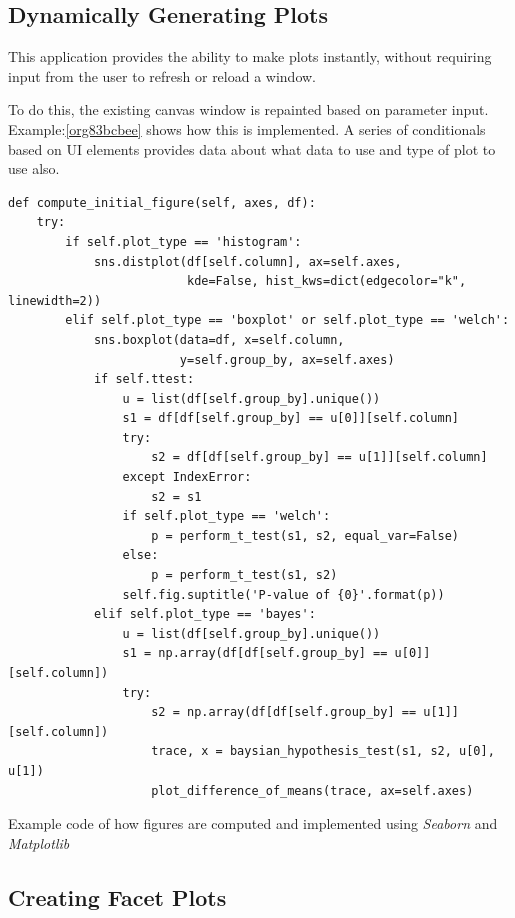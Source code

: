 \documentclass[11pt]{report}
\begin{document}
\subsection{Dynamically Generating Plots}
\label{sec:orge625e67}
This application provides the ability to make plots instantly, without requiring input from the user to refresh or reload a window.

To do this, the existing canvas window is repainted based on parameter input. Example:\ref{org83bcbee}
shows how this is implemented. A series of conditionals based on UI elements provides data about what data to use and type of plot to use also.

\begin{listing}[htbp]
\begin{verbatim}
def compute_initial_figure(self, axes, df):
    try:
        if self.plot_type == 'histogram':
            sns.distplot(df[self.column], ax=self.axes,
                         kde=False, hist_kws=dict(edgecolor="k", linewidth=2))
        elif self.plot_type == 'boxplot' or self.plot_type == 'welch':
            sns.boxplot(data=df, x=self.column,
                        y=self.group_by, ax=self.axes)
            if self.ttest:
                u = list(df[self.group_by].unique())
                s1 = df[df[self.group_by] == u[0]][self.column]
                try:
                    s2 = df[df[self.group_by] == u[1]][self.column]
                except IndexError:
                    s2 = s1
                if self.plot_type == 'welch':
                    p = perform_t_test(s1, s2, equal_var=False)
                else:
                    p = perform_t_test(s1, s2)
                self.fig.suptitle('P-value of {0}'.format(p))
            elif self.plot_type == 'bayes':
                u = list(df[self.group_by].unique())
                s1 = np.array(df[df[self.group_by] == u[0]][self.column])
                try:
                    s2 = np.array(df[df[self.group_by] == u[1]][self.column])
                    trace, x = baysian_hypothesis_test(s1, s2, u[0], u[1])
                    plot_difference_of_means(trace, ax=self.axes)
\end{verbatim}
\caption{\label{org83bcbee}
Example code of how figures are computed and implemented using \emph{Seaborn} and \emph{Matplotlib}}
\end{listing}

\clearpage
\subsection{Creating Facet Plots}
\label{sec:org23b8357}
\end{document}
